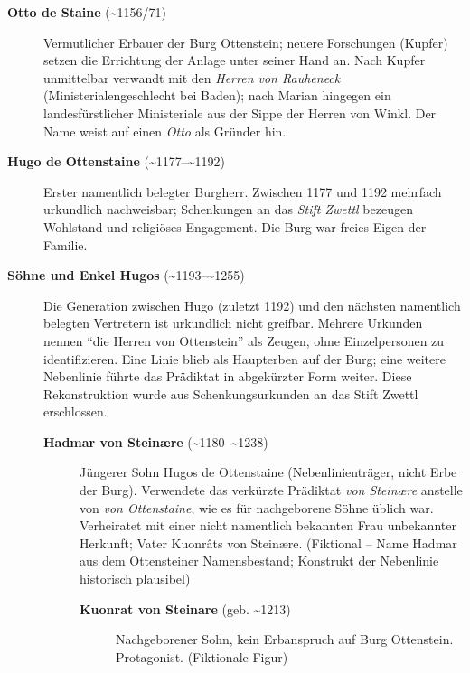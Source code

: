 \begin{description}
  \item[\textbf{Otto de Staine} (\textasciitilde{}1156/71)] Vermutlicher Erbauer der Burg Ottenstein; neuere Forschungen (Kupfer) setzen die Errichtung der Anlage unter seiner Hand an. Nach Kupfer unmittelbar verwandt mit den \textit{Herren von Rauheneck} (Ministerialengeschlecht bei Baden); nach Marian hingegen ein landesfürstlicher Ministeriale aus der Sippe der Herren von Winkl. Der Name weist auf einen \textit{Otto} als Gründer hin. \cite{noe_burgen_online_ottenstein}

  \item[\textbf{Hugo de Ottenstaine} (\textasciitilde{}1177--\textasciitilde{}1192)] Erster namentlich belegter Burgherr. Zwischen 1177 und 1192 mehrfach urkundlich nachweisbar; Schenkungen an das \textit{Stift Zwettl} bezeugen Wohlstand und religiöses Engagement. Die Burg war freies Eigen der Familie. \cite{noe_burgen_online_ottenstein}

  \item[\textbf{Söhne und Enkel Hugos} (\textasciitilde{}1193--\textasciitilde{}1255)] Die Generation zwischen Hugo (zuletzt 1192) und den nächsten namentlich belegten Vertretern ist urkundlich nicht greifbar. Mehrere Urkunden nennen \enquote{die Herren von Ottenstein} als Zeugen, ohne Einzelpersonen zu identifizieren. Eine Linie blieb als Haupterben auf der Burg; eine weitere Nebenlinie führte das Prädiktat in abgekürzter Form weiter. Diese Rekonstruktion wurde aus Schenkungsurkunden an das Stift Zwettl erschlossen.

  \begin{description}
    \item[\textbf{Hadmar von Steinære} (\textasciitilde{}1180--\textasciitilde{}1238)] Jüngerer Sohn Hugos de Ottenstaine (Nebenlinienträger, nicht Erbe der Burg). Verwendete das verkürzte Prädiktat \textit{von Steinære} anstelle von \textit{von Ottenstaine}, wie es für nachgeborene Söhne üblich war. Verheiratet mit einer nicht namentlich bekannten Frau unbekannter Herkunft; Vater Kuonrâts von Steinære. (Fiktional -- Name Hadmar aus dem Ottensteiner Namensbestand; Konstrukt der Nebenlinie historisch plausibel)
    \begin{description}
      \item[\textbf{\gls{Kuonrat von Steinare}} (geb. \textasciitilde{}1213)] Nachgeborener Sohn, kein Erbanspruch auf Burg Ottenstein. Protagonist. (Fiktionale Figur)
    \end{description}
  \end{description}


\end{description}
